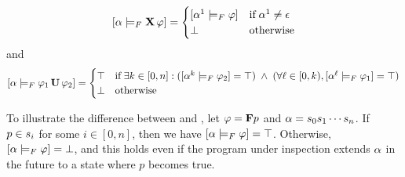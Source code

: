\[
\left[\alpha \models_F \mathbf{X}\, \varphi\right]  = 
\begin{cases}
	[\alpha^1 \models_F \varphi] & \text{if}\; 
\alpha^1 \neq \epsilon \\
	\bot & \text{\normalfont otherwise}
\end{cases}
\]
and
\[
\left[\alpha \models_F \varphi_1 \,\mathbf{U}\, \varphi_2\right] 
= 
\begin{cases}
\top & \text{if}\; \exists k \in [0,n]: ([\alpha^k 
\models_F \varphi_2] = \top) \;\wedge \; (\forall \ell \in [0,k), 
[\alpha^\ell \models_F \varphi_1] = \top)\\
	\bot & \text{\normalfont otherwise}
\end{cases}
\]

%





To illustrate the difference between \LTL and \FLTL, let $\varphi = \mathbf{F} p$ and  
$\alpha=s_0s_1\cdots s_{n}$. If $p \in s_i$ for some $i 
\in [0, n]$, then we have $[\alpha \models_F \varphi] = \top$. Otherwise, 
$[\alpha \models_F \varphi] = \bot$, and this holds even if the program under 
inspection extends $\alpha$ in the future to a state where $p$ becomes true. 


